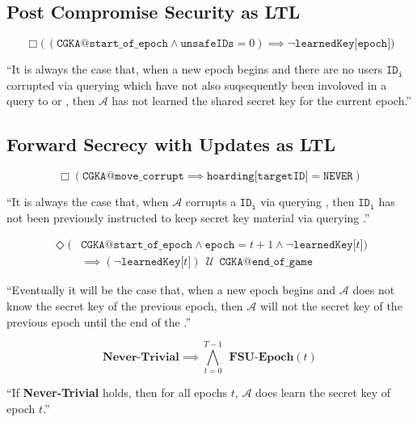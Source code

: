\hypertarget{sec:pcs-as-ltl}{%
\subsection{Post Compromise Security as LTL}\label{sec:pcs-as-ltl}}

\begin{LTL}
\[
    \Box \Big(\, ( \texttt{CGKA@start\_of\_epoch} \land \texttt{unsafeIDs} = 0 ) \implies \neg \texttt{learnedKey[epoch]} \Big)
\]
\begin{quoting}
``It is always the case that, when a new epoch begins and there are no users \(\mathtt{ID_{i}}\) corrupted via querying  which have not also suqsequently been involoved in a query to  or , then \(\mathcal{A}\) has not learned the shared secret key for the current epoch.''
\end{quoting}
\end{LTL}


\hypertarget{sec:fsu-as-ltl}{%
\subsection{Forward Secrecy with Updates as LTL}\label{sec:fsu-as-ltl}}

\begin{LTL}
\[
    \Box \left( \texttt{CGKA@move\_corrupt} \implies \texttt{hoarding[targetID]} = \texttt{NEVER} \right)
\]
\begin{quoting}
``It is always the case that, when \(\mathcal{A}\) corrupts a \(\mathtt{ID_{i}}\) via querying , then \(\mathtt{ID_{i}}\) has not been previously instructed to keep secret key material via querying .''
\end{quoting}
\end{LTL}


\begin{LTL}
\begin{equation*}
\begin{split}
    \Diamond ( & \texttt{CGKA@start\_of\_epoch} \land \texttt{epoch} = t + 1 \land \neg \texttt{learnedKey[$t$]} ) \\
               & \implies ( \neg \texttt{learnedKey[$t$]} ) \,\;{\mathcal {U}}\;\, \texttt{CGKA@end\_of\_game}
\end{split}
\end{equation*}
\begin{quoting}
``Eventually it will be the case that, when a new epoch begins and \(\mathcal{A}\) does not know the secret key of the previous epoch, then \(\mathcal{A}\) will not the secret key of the previous epoch until the end of the \CGKAsec.''
\end{quoting}
\end{LTL}

\begin{LTL}
\[
    \textbf{Never-Trivial} \implies \bigwedge\limits_{t=0}^{T-1} \;\,\textbf{FSU-Epoch}(t)
\]
\begin{quoting}
``If \textbf{Never-Trivial} holds, then for all epochs \(t\), \(\mathcal{A}\) does learn the secret key of epoch \(t\).''
\end{quoting}
\end{LTL}
